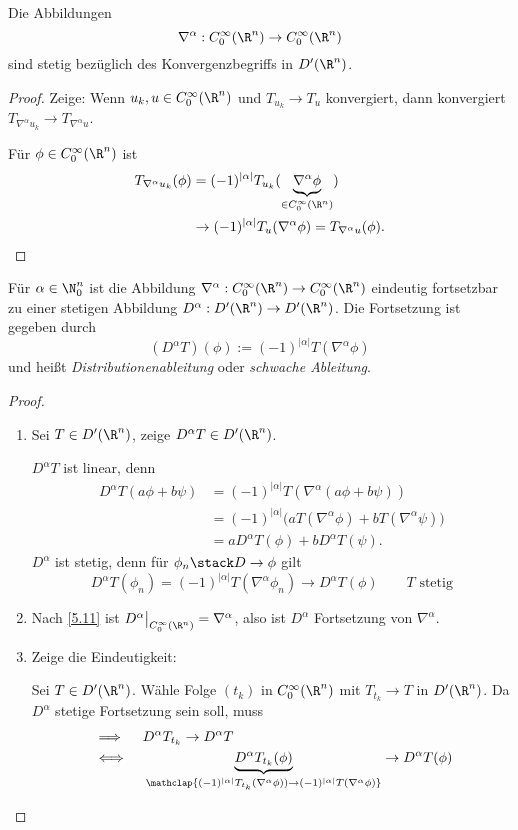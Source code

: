 \begin{st} \label{5.12}
	Die Abbildungen
	\[
		\nabla^\alpha : C_0^\infty(\R^n) \to C_0^\infty(\R^n)
	\]
	sind stetig bezüglich des Konvergenzbegriffs in $D'(\R^n)$.
	\begin{proof}
		Zeige: Wenn $u_k, u \in C_0^\infty(\R^n)$ und $T_{u_k} \to T_u$ konvergiert, dann konvergiert $T_{\nabla^\alpha u_k} \to T_{\nabla^\alpha u}$.

		Für $\phi \in C_0^\infty(\R^n)$ ist
		\begin{align*}
			T_{\nabla^\alpha u_k} (\phi) 
			&= (-1)^{|\alpha|} T_{u_k} (\underbrace{\nabla^\alpha \phi}_{\in C_0^\infty(\R^n)}) \\
			&\to (-1)^{|\alpha|} T_u(\nabla^\alpha \phi)
			= T_{\nabla^\alpha u}(\phi).
		\end{align*}
	\end{proof}
\end{st}

\begin{st} \label{5.13}
	Für $\alpha \in \N_0^n$ ist die Abbildung $\nabla^\alpha: C_0^\infty(\R^n) \to C_0^\infty(\R^n)$ eindeutig fortsetzbar zu einer stetigen Abbildung $D^\alpha: D'(\R^n) \to D'(\R^n)$.
	Die Fortsetzung ist gegeben durch
	\[
		(D^\alpha T)(\phi) := (-1)^{|\alpha|} T(\nabla^\alpha \phi)
	\]
	und heißt \emph{Distributionenableitung} oder \emph{schwache Ableitung}.
	\begin{proof}
		\begin{enumerate}[1)]
			\item
				Sei $T \in D'(\R^n)$, zeige $D^\alpha T \in D'(\R^n)$.

				$D^\alpha T$ ist linear, denn
				\begin{align*}
					D^\alpha T(a \phi + b \psi)
					&= (-1)^{|\alpha|} T(\nabla^{\alpha}(a \phi + b\psi)) \\
					&= (-1)^{|\alpha|} \big( aT(\nabla^\alpha \phi) + bT(\nabla^\alpha \psi) \big) \\
					&= a D^\alpha T(\phi) + b D^\alpha T(\psi).
				\end{align*}
				$D^\alpha$ ist stetig, denn für $\phi_n \stack D\to \phi$ gilt
				\[
					D^\alpha T(\phi_n)
					= (-1)^{|\alpha|} T(\nabla^\alpha \phi_n)
					\to D^\alpha T(\phi) \qquad \text{$T$ stetig}
				\]
			\item
				Nach \ref{5.11} ist $D^\alpha \big|_{C_0^\infty(\R^n)} = \nabla^\alpha$, also ist $D^\alpha$ Fortsetzung von $\nabla^\alpha$.
			\item
				Zeige die Eindeutigkeit:

				Sei $T \in D'(\R^n)$.
				Wähle Folge $(t_k)$ in $C_0^\infty(\R^n)$ mit $T_{t_k} \to T$ in $D'(\R^n)$.
				Da $D^\alpha$ stetige Fortsetzung sein soll, muss
				\begin{align*}
					&\implies \quad D^\alpha T_{t_k} \to D^\alpha T \\
					&\iff \quad \underbrace{D^\alpha T_{t_k}(\phi)}_{\mathclap{(-1)^{|\alpha|}T_{t_k}(\nabla^\alpha \phi)) \to (-1)^{|\alpha|}T(\nabla^\alpha \phi)}} \to D^\alpha T(\phi)
				\end{align*}
		\end{enumerate}
	\end{proof}
\end{st}


